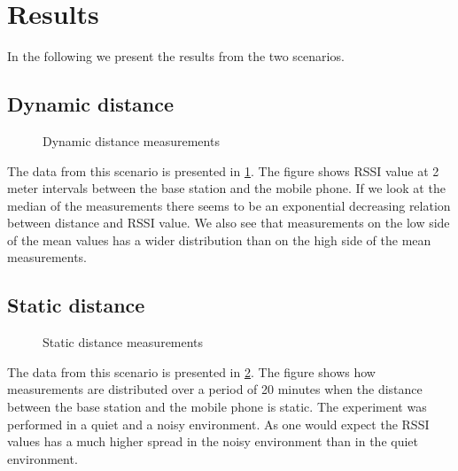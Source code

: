 \section{Results}
\label{sec_results}

In the following we present the results from the two scenarios.

\subsection{Dynamic distance}

\begin{figure}		
	
	
	
	\caption{ Dynamic distance measurements }
	\label{graf_DynamicMesurements}
	
\end{figure}

%	
%	
%	
%	

The data from this scenario is presented in \cref{graf_DynamicMesurements}.
The figure shows RSSI value at 2 meter intervals between the base station and the mobile phone.
If we look at the median of the measurements there seems to be an exponential decreasing relation between distance and RSSI value.
We also see that measurements on the low side of the mean values has a wider distribution than on the high side of the mean measurements.

\subsection{Static distance}
\begin{figure}
	
	
	\caption{Static distance measurements}
	\label{graf_StaticMesurements}
\end{figure}

The data from this scenario is presented in \cref{graf_StaticMesurements}.
The figure shows how measurements are distributed over a period of 20 minutes when the distance between the base station and the mobile phone is static.
The experiment was performed in a quiet and a noisy environment.
As one would expect the RSSI values has a much higher spread in the noisy environment than in the quiet environment. 
 

